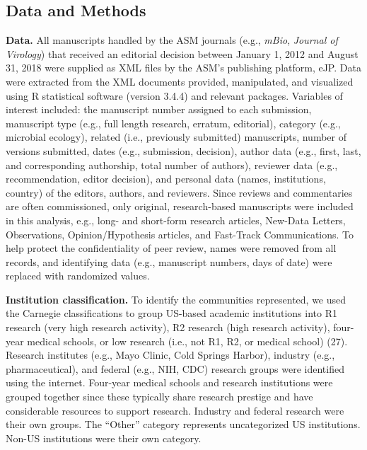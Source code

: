\documentclass[11pt,]{article}
\begin{document}
\hypertarget{data-and-methods}{%
\subsection{Data and Methods}\label{data-and-methods}}

\textbf{Data.} All manuscripts handled by the ASM journals (e.g.,
\emph{mBio}, \emph{Journal of Virology}) that received an editorial
decision between January 1, 2012 and August 31, 2018 were supplied as
XML files by the ASM's publishing platform, eJP. Data were extracted
from the XML documents provided, manipulated, and visualized using R
statistical software (version 3.4.4) and relevant packages. Variables of
interest included: the manuscript number assigned to each submission,
manuscript type (e.g., full length research, erratum, editorial),
category (e.g., microbial ecology), related (i.e., previously submitted)
manuscripts, number of versions submitted, dates (e.g., submission,
decision), author data (e.g., first, last, and corresponding authorship,
total number of authors), reviewer data (e.g., recommendation, editor
decision), and personal data (names, institutions, country) of the
editors, authors, and reviewers. Since reviews and commentaries are
often commissioned, only original, research-based manuscripts were
included in this analysis, e.g., long- and short-form research articles,
New-Data Letters, Observations, Opinion/Hypothesis articles, and
Fast-Track Communications. To help protect the confidentiality of peer
review, names were removed from all records, and identifying data (e.g.,
manuscript numbers, days of date) were replaced with randomized values.

\textbf{Institution classification.} To identify the communities
represented, we used the Carnegie classifications to group US-based
academic institutions into R1 research (very high research activity), R2
research (high research activity), four-year medical schools, or low
research (i.e., not R1, R2, or medical school) (27). Research institutes
(e.g., Mayo Clinic, Cold Springs Harbor), industry (e.g.,
pharmaceutical), and federal (e.g., NIH, CDC) research groups were
identified using the internet. Four-year medical schools and research
institutions were grouped together since these typically share research
prestige and have considerable resources to support research. Industry
and federal research were their own groups. The ``Other'' category
represents uncategorized US institutions. Non-US institutions were their
own category.
\end{document}
